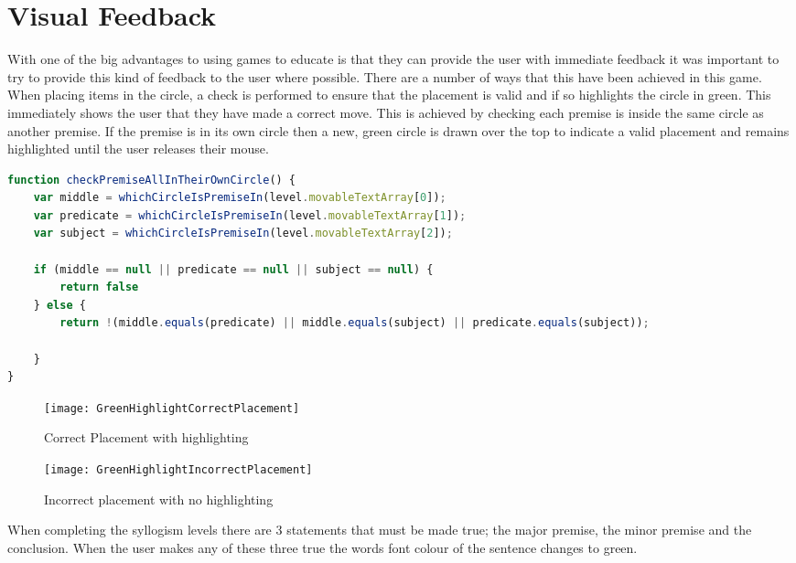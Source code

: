 \documentclass[12pt,a4paper]{report}
\begin{document}
	\section{Visual Feedback}
With one of the big advantages to using games to educate is that they can provide the user with immediate feedback it was important to try to provide this kind of feedback to the user where possible. There are a number of ways that this have been achieved in this game. When placing items in the circle, a check is performed to ensure that the placement is valid and if so highlights the circle in green. This immediately shows the user that they have made a correct move.  This is achieved by checking each premise is inside the same circle as another premise. If the premise is in its own circle then a new, green circle is drawn over the top to indicate a valid placement and remains highlighted until the user releases their mouse.

\begin{minipage}{\linewidth}
\begin{lstlisting}[language=JavaScript]
function checkPremiseAllInTheirOwnCircle() {
    var middle = whichCircleIsPremiseIn(level.movableTextArray[0]);
    var predicate = whichCircleIsPremiseIn(level.movableTextArray[1]);
    var subject = whichCircleIsPremiseIn(level.movableTextArray[2]);

    if (middle == null || predicate == null || subject == null) {
        return false
    } else {
        return !(middle.equals(predicate) || middle.equals(subject) || predicate.equals(subject));

    }
}
\end{lstlisting}
\end{minipage}

\begin{figure}[!h]
  \centering
  \begin{minipage}[b]{0.4\textwidth}
    \texttt{[image: GreenHighlightCorrectPlacement]}
    \caption{Correct Placement with highlighting}
  \end{minipage}
  \hfill
  \begin{minipage}[b]{0.4\textwidth}
    \texttt{[image: GreenHighlightIncorrectPlacement]}
    \caption{Incorrect placement with no highlighting}
  \end{minipage}
\end{figure}
\FloatBarrier

When completing the syllogism levels there are 3 statements that must be made true; the major premise, the minor premise and the conclusion. When the user makes any of these three true the words font colour of the sentence changes to green.
\end{document}
